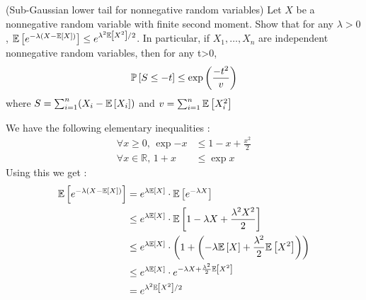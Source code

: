 \begin{exercise}[]{(Sub-Gaussian lower tail for nonnegative random variables)}
	Let $ X $ be a nonnegative random variable with finite second moment. Show that for any $ \lambda >0 $, $ \mathbb{E}\left[e^{-\lambda(X-\mathbb{E}\left[X\right])}\right] \leq e^{\lambda^2\mathbb{E}\left[X^2\right]/2} $. In particular, if $ X_1,\ldots,X_n $ are independent nonnegative random variables, then for any t>0,
\begin{equation*}
	\mathbb{P}\left[S \leq -t\right] \leq \exp{\left( \frac{-t^2}{v} \right)}
\end{equation*}
where $ S = \sum_{i=1}^{n}(X_i-\mathbb{E}\left[X_i\right]) $ and $ v =\sum_{i=1}^{n}\mathbb{E}\left[X_i^2\right] $

\end{exercise}

\begin{solution}[]
	We have the following elementary inequalities :
\begin{align*}
	\forall x\geq 0,\, \exp{-x} &\leq 1 -x +\frac{x^2}{2} \\
	\forall x \in \mathbb{R},\, 1+x &\leq \exp{x}
\end{align*}
Using this we get :
\begin{align*}
	\mathbb{E}\left[e^{-\lambda(X-\mathbb{E}\left[X\right])}\right] &= e^{\lambda \mathbb{E}\left[X\right]}\cdot\mathbb{E}\left[e^{-\lambda X}\right] \\
				    &\leq e^{\lambda \mathbb{E}\left[X\right]} \cdot  \mathbb{E}\left[1-\lambda X + \frac{\lambda^2 X^2}{2}\right]\\
				    &\leq e^{\lambda \mathbb{E}\left[X\right]} \cdot \left( 1 + \left(-\lambda \mathbb{E}\left[X\right] + \frac{\lambda^2}{2}\mathbb{E}\left[X^2\right]\right) \right)\\
				    &\leq e^{\lambda \mathbb{E}\left[X\right]} \cdot e^{-\lambda X + \frac{\lambda^2}{2}\mathbb{E}\left[X^2\right]} \\
				    &= e^{\lambda^2\mathbb{E}\left[X^2\right]/2}
\end{align*}

\end{solution}
